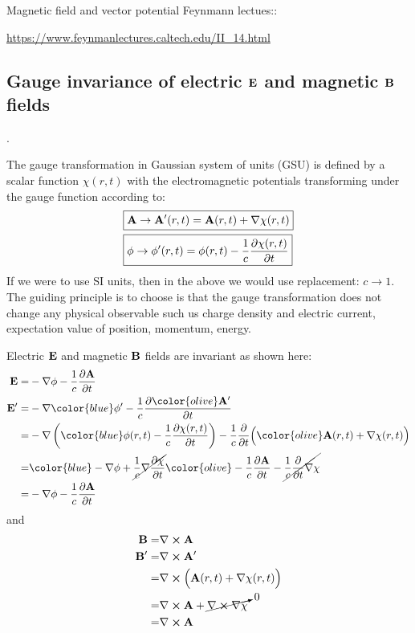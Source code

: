 \documentclass[11pt]{article}
\begin{document}
Magnetic field and vector potential Feynmann lectues::

\url{https://www.feynmanlectures.caltech.edu/II_14.html }
\subsection{ Gauge invariance of electric $\vb E$ and magnetic $\vb B$ fields}. 


The  gauge transformation in Gaussian system of units  (GSU) is defined by a scalar function $\chi(r,t)$  with  the electromagnetic potentials transforming under the gauge function according to:
\begin{align}
    &\label{eq:gauge_rule_vector_pot} 
    \boxed{ \vb A \to \vb A'(r,t)= \vb A(r,t) + \nabla \chi(r,t) } \\
    &\label{eq:gauge_rule_scalar_pot} 
    \boxed{ \phi \to \phi'(r,t) = \phi(r,t) -\frac{1}{c} \pdv{\chi(r,t)}{t} }
\end{align}
If we were to use SI units, then in the above  we would use replacement: $c\to 1$.
The guiding principle is to choose is  that the gauge transformation does not change any physical  observable such us charge density and electric current, expectation value of position, momentum, energy.






 Electric $\vb E$ and magnetic $\vb B$ fields are invariant as shown here:
\begin{align}
    \vb E  =&  - \nabla \phi  - \frac{1}{c} \pdv{\vb A}{t} \label{eq:Psi_gauge_transf}\\
    \vb E' =&  - \nabla {\color{blue} \phi'} -  \frac{1}{c} \pdv{ \color{olive} \vb A'}{t} \nonumber \\
           =&  -\nabla \left({ \color{blue} \phi(r,t)   -   \frac{1}{c} \pdv{\chi(r,t)}{t} } \right) 
              -   \frac{1}{c}  \pdv{}{t} \Big( {\color{olive}    \vb A(r,t)  +  \nabla  \chi(r,t)   }\Big)   \nonumber \\
      =&  { \color{blue}  - \nabla \phi  +  \cancel{  \frac{1}{c}  \nabla \pdv{\chi}{t} } }
        {\color{olive}  -  \frac{1}{c} \pdv{\vb A}{t}  -  \cancel{ \frac{1}{c}  \pdv{}{t} \nabla \chi } }  \nonumber \\
           = & - \nabla \phi  -  \frac{1}{c} \pdv{\vb A}{t} \nonumber
\end{align}
and 
\begin{align*}
    \vb  B =&   \nabla \cross \vb A \\
    \vb  B' =&   \nabla \cross \vb A' \\
            =&  \nabla \cross \Big( \vb A(r,t)  +  \nabla  \chi(r,t) \Big)\\
            =&   \nabla \cross \vb A  + \cancelto{0}{ \nabla \cross \nabla \chi } \\
            = & \nabla \cross \vb A 
\end{align*}
\end{document}

